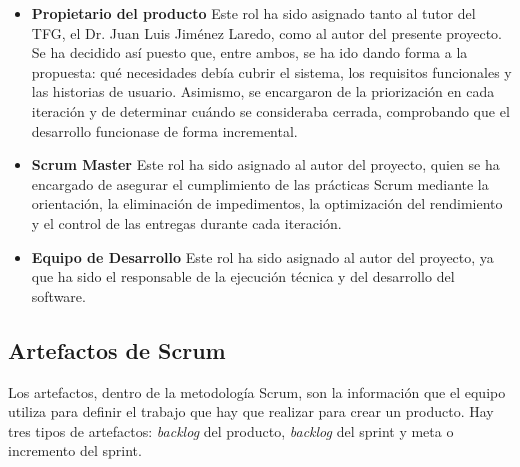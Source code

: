 \begin{itemize}
    \item \textbf{Propietario del producto}
    \newline
    Este rol ha sido asignado tanto al tutor del TFG, el Dr. Juan Luis Jiménez
    Laredo, como al autor del presente proyecto. Se ha decidido así puesto que, entre ambos, se ha ido dando forma
    a la propuesta: qué necesidades debía cubrir el sistema, los requisitos funcionales y las historias de usuario.
    Asimismo, se encargaron de la priorización en cada iteración y de determinar cuándo se consideraba cerrada, comprobando
    que el desarrollo funcionase de forma incremental.

    \item \textbf{Scrum Master}
    \newline
    Este rol ha sido asignado al autor del proyecto, quien se ha encargado de asegurar el
    cumplimiento de las prácticas Scrum mediante la orientación, la eliminación de impedimentos, la optimización del rendimiento
    y el control de las entregas durante cada iteración.
    
    \item \textbf{Equipo de Desarrollo}
    \newline
    Este rol ha sido asignado al autor del proyecto, ya que ha sido el
    responsable de la ejecución técnica y del desarrollo del software.
\end{itemize}

\subsection{Artefactos de Scrum}

Los artefactos, dentro de la metodología Scrum, son la información que el equipo utiliza para definir el trabajo que hay que
realizar para crear un producto. Hay tres tipos de artefactos: \textit{backlog} del producto, \textit{backlog} del sprint y
meta o incremento del sprint.


